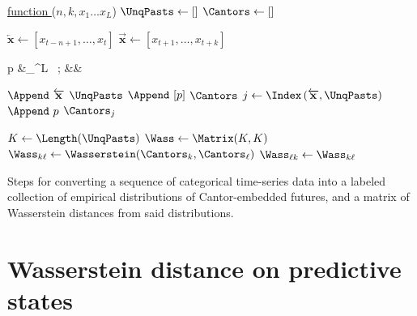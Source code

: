 \documentclass[sigconf, anonymous, review]{acmart}
\begin{document}
\begin{algorithm}[t]
   
  
  \underline{function \CantorWasserstein} ($n,k,x_1\dots x_L$)\;
  $\UnqPasts \leftarrow \left[\right]$\; 
  $\Cantors \leftarrow \left[\right]$\; 
   { 
    $\overleftarrow{\mathbf{x}} \leftarrow \left[x_{t-n+1},\dots, x_{t}\right]$\;
    $\overrightarrow{\mathbf{x}} \leftarrow \left[x_{t+1},\dots, x_{t+k}\right]$\;
      \vspace{-1.5em}
      \begin{flalign*}
        p &\leftarrow \sum_{}^L
        \ ; &&
      \end{flalign*}

       { 
        $\Append\ \overleftarrow{\mathbf{x}}$ \KwTo $\UnqPasts$\; 
        $\Append\ [p]$ \KwTo $\Cantors$\; 
        } { 
        $j \leftarrow \Index\left(\overleftarrow{\mathbf{x}},\UnqPasts\right)$\;
        $\Append\ p$ \KwTo $\Cantors_j$\; 
        } 
  }
  $K \leftarrow \Length(\UnqPasts)$\; 
  $\Wass \leftarrow \Matrix(K,K)$\;
   { 
     {  
      $\Wass_{k \ell}
        \leftarrow
        \Wasserstein(\Cantors_k,\Cantors_\ell)$\;
        $\Wass_{\ell k} \leftarrow \Wass_{k \ell}$\; } } 
  \KwResult{$\UnqPasts$,$\Cantors$,$\Wass$}
  \caption{Steps for converting a sequence of categorical time-series data
        into a labeled collection of empirical distributions of Cantor-embedded futures,
        and a matrix of Wasserstein distances from said distributions.}
  \label{alg:cantorwass}
\end{algorithm}

\section{Wasserstein distance on predictive states}
\end{document}
